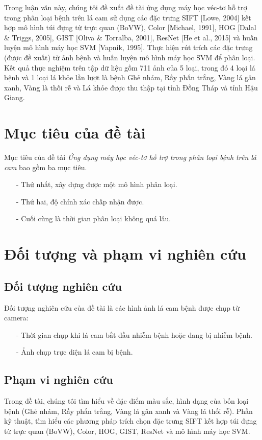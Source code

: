 Trong luận văn này, chúng tôi đề xuất đề tài ứng dụng máy học véc-tơ hỗ trợ trong phân loại bệnh trên lá cam sử dụng các đặc trưng  SIFT [Lowe, 2004] kết hợp mô hình túi đựng từ trực quan (BoVW), Color [Michael, 1991], HOG [Dalal \& Triggs, 2005], GIST [Oliva \& Torralba, 2001], ResNet [He et al., 2015] và huấn luyện mô hình máy học SVM [Vapnik, 1995]. Thực hiện rút trích các đặc trưng (được đề xuất) từ ảnh bệnh và huấn luyện mô hình máy học SVM để phân loại. Kết quả thực nghiệm trên tập dữ liệu gồm 711 ảnh của 5 loại, trong đó 4 loại lá bệnh và 1 loại lá khỏe lần lượt là bệnh Ghẻ nhám, Rầy phấn trắng, Vàng lá gân xanh, Vàng là thối rễ và Lá khỏe được thu thập tại tỉnh Đồng Tháp và tỉnh Hậu Giang.


\section{Mục tiêu của đề tài}
Mục tiêu của đề tài \emph{Ứng dụng máy học véc-tơ hỗ trợ trong phân loại bệnh trên lá cam} bao gồm ba mục tiêu. 
\begin{itemize}
\item[-] Thứ nhất, xây dựng được một mô hình phân loại. 
\item[-] Thứ hai, độ chính xác chấp nhận được. 
\item[-] Cuối cùng là thời gian phân loại không quá lâu.
\end{itemize}

\section{Đối tượng và phạm vi nghiên cứu}
\subsection{Đối tượng nghiên cứu}
Đối tượng nghiên cứu của đề tài là các hình ảnh lá cam bệnh được chụp từ camera:
\begin{itemize}
	\item[-] Thời gian chụp khi lá cam bắt đầu nhiễm bệnh hoặc đang bị nhiễm bệnh.
	\item[-] Ảnh chụp trực diện lá cam bị bệnh.
\end{itemize}

\subsection{Phạm vi nghiên cứu}
Trong đề tài, chúng tôi tìm hiểu về đặc điểm màu sắc, hình dạng của bốn loại bệnh (Ghẻ nhám, Rầy phấn trắng, Vàng lá gân xanh và Vàng lá thối rễ). Phần kỹ thuật, tìm hiểu các phương pháp trích chọn đặc trưng SIFT kết hợp túi đựng từ trực quan (BoVW), Color, HOG, GIST, ResNet và mô hình máy học SVM.

